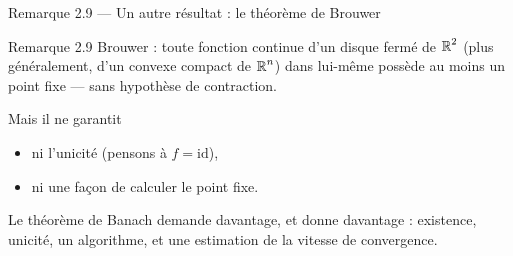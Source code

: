 \begin{frame}{Remarque 2.9 --- Un autre résultat : le théorème de Brouwer}
  \begin{Rem}{Remarque 2.9}
    \small Brouwer : toute fonction continue d'un disque
    fermé de $\operatorname{\mathbb{R}}^2$ (plus généralement, d'un convexe compact de $\operatorname{\mathbb{R}}^n$)
    dans lui-même possède au moins un point fixe --- sans
    hypothèse de contraction.
    \vspace{4pt}

    Mais il ne garantit
    \begin{itemize}
      \item ni l'unicité (pensons à $f=\mathrm{id}$),
      \item ni une façon de calculer le point fixe.
    \end{itemize}
  \end{Rem}
  \vspace{4pt}
  \small Le théorème de Banach demande davantage, et donne davantage :
  existence, unicité, un algorithme, et une estimation de la
  vitesse de convergence.
\end{frame}
